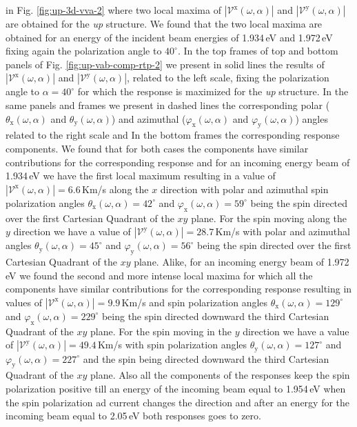 \documentclass[prb,11pt,tightenlines,twocolumn,aps]{revtex4-1}
\begin{document}
in Fig. \ref{fig:up-3d-vva-2} where two local maxima of
$|\mathcal{V}^{\mathrm{x}}(\omega,\alpha)|$ and
$|\mathcal{V}^{\mathrm{y}}(\omega,\alpha)|$ are obtained for the \emph{up}
structure.
% 
We found that the two local maxima are obtained for an energy of the incident
beam energies of 1.934\,eV and 1.972\,eV fixing again the polarization angle to
$40^{\circ}$. 
In the top frames of top and bottom panels of Fig. \ref{fig:up-vab-comp-rtp-2}
we present in solid lines the results of
$|\mathcal{V}^{\mathrm{x}}(\omega,\alpha)|$ and
$|\mathcal{V}^{\mathrm{y}}(\omega,\alpha)|$, related to the left scale, fixing
the polarization angle to $\alpha=40^{\circ}$ for which the response is
maximized for the \emph{up} structure. In the same panels and frames we present
in dashed lines the corresponding polar ($\theta_{\mathrm{x}}(\omega,\alpha)$
and $\theta_{\mathrm{y}}(\omega,\alpha)$) and azimuthal
($\varphi_{\mathrm{x}}(\omega,\alpha)$ and
$\varphi_{\mathrm{y}}(\omega,\alpha)$) angles related to the right scale and  In
the bottom frames the corresponding response components.
% 
We found that for both cases the components have similar contributions for the corresponding response and for
an incoming energy beam of 1.934\,eV  we have the first local maximum resulting
in a value of $|\mathcal{V}^{\mathrm{x}}(\omega,\alpha)|= 6.6$\,Km/s along the
$x$ direction  with polar and azimuthal spin polarization angles
$\theta_{\mathrm{x}}(\omega,\alpha)= 42^{\circ}$ and
$\varphi_{\mathrm{x}}(\omega,\alpha)=59^{\circ}$ being the spin
directed over the first Cartesian Quadrant of the $xy$ plane.
% 
For the spin moving along the $y$ direction we have a value of
$|\mathcal{V}^{\mathrm{y}}(\omega,\alpha)|=28.7$\,Km/s with polar and azimuthal
angles $\theta_{\mathrm{y}}(\omega,\alpha)=45^{\circ}$ and
$\varphi_{\mathrm{y}}(\omega,\alpha)=56^{\circ}$ being  the spin directed over
the first Cartesian Quadrant of the $xy$ plane.
% 
Alike, for an incoming energy beam of 1.972\,eV we found the second and more
intense local maxima for which all the components have similar contributions for
the corresponding response resulting in values of
$|\mathcal{V}^{\mathrm{x}}(\omega,\alpha)|=9.9$\,Km/s and spin polarization
angles $\theta_{\mathrm{x}}(\omega,\alpha)=129^{\circ}$ and
$\varphi_{\mathrm{x}}(\omega,\alpha)=229^{\circ}$ being the spin directed
downward the third Cartesian Quadrant of the $xy$ plane.
% 
For the spin moving in the $y$ direction we have a value of
$|\mathcal{V}^{\mathrm{y}}(\omega,\alpha)|=49.4$\,Km/s with spin polarization
angles $\theta_{\mathrm{y}}(\omega,\alpha)=127^{\circ}$ and
$\varphi_{\mathrm{y}}(\omega,\alpha)=227^{\circ}$ and the spin being
directed downward the third Cartesian Quadrant of the $xy$ plane.
% 
Also all the components of the responses keep the spin polarization positive
till an energy of the incoming beam equal to 1.954\,eV when the spin
polarization ad current changes the direction and after an energy for the
incoming beam equal to 2.05\,eV both responses goes to zero.
\end{document}
